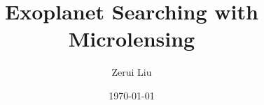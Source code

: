 \documentclass[UTF8]{beamer}
\author{Zerui Liu}
\institute{National Astronomical Observatory}
\title{Exoplanet Searching with Microlensing}
\date{\today}
\begin{document}
    \begin{frame}
        \maketitle
        
    \end{frame}
\end{document}
